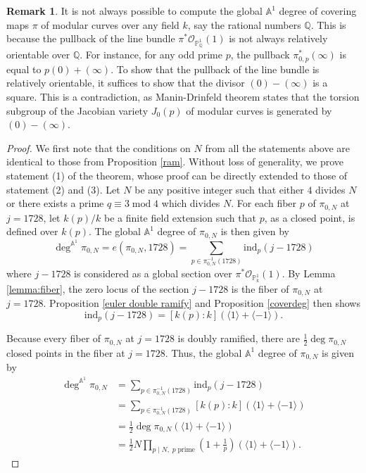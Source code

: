 \documentclass[12pt, reqno]{amsart}
\theoremstyle{definition}
\newtheorem{remark}[theorem]{Remark}
\newcommand{\A}{\mathbb{A}} %
\newcommand{\Proj}{\mathbb{P}} %
\newcommand{\Q}{\mathbb{Q}}
\newcommand{\Adeg}{\deg^{\mathbb{A}^1}} %
\newcommand{\Oh}{\mathscr{O}} %
\newcommand{\ind}{\mathrm{ind}} %
\begin{document}
\begin{remark}
It is not always possible to compute the global $\A^1$ degree of covering maps $\pi$ of modular curves over any field $k$, say the rational numbers $\Q$. This is because the pullback of the line bundle $\pi^* \Oh_{\Proj^1_\mathbb{Q}}(1)$ is not always relatively orientable over $\Q$. For instance, for any odd prime $p$, the pullback $\pi_{0,p}^*(\infty)$ is equal to $p (0) + (\infty)$. To show that the pullback of the line bundle is relatively orientable, it suffices to show that the divisor $(0) - (\infty)$ is a square. This is a contradiction, as Manin-Drinfeld theorem states that the torsion subgroup of the Jacobian variety $J_0(p)$ of modular curves is generated by $(0) - (\infty)$. 
\end{remark}

\begin{proof}
We first note that the conditions on $N$ from all the statements above are identical to those from Proposition \ref{ram}. Without loss of generality, we prove statement (1) of the theorem, whose proof can be directly extended to those of statement (2) and (3). 
Let $N$ be any positive integer such that either $4$ divides $N$ or there exists a prime $q \equiv 3 \; \text{mod} \; 4$ which divides $N$. For each fiber $p$ of $\pi_{0,N}$ at $j = 1728$, let $k(p) / k$ be a finite field extension such that $p$, as a closed point, is defined over $k(p)$. The global $\A^1$ degree of $\pi_{0,N}$ is then given by
\begin{equation*}
    \Adeg \pi_{0,N} = e(\pi_{0,N}, 1728) = \sum_{p \in \pi_{0,N}^{-1}(1728)} \ind_p (j-1728)
\end{equation*}
where $j - 1728$ is considered as a global section over $\pi^* \Oh_{\Proj^1_k}(1)$. By Lemma \ref{lemma:fiber}, the zero locus of the section $j - 1728$ is the fiber of $\pi_{0,N}$ at $j = 1728$. Proposition \ref{euler double ramify} and Proposition \ref{coverdeg} then shows
\begin{equation*}
    \ind_p (j - 1728) = [k(p):k] (\langle 1 \rangle + \langle -1 \rangle).
\end{equation*}

Because every fiber of $\pi_{0,N}$ at $j=1728$ is doubly ramified, there are $\frac{1}{2} \deg \pi_{0,N}$ closed points in the fiber at $j = 1728$. Thus, the global $\A^1$ degree of $\pi_{0,N}$ is given by
\begin{align*}
    \Adeg \pi_{0,N} &= \sum_{p \in \pi_{0,N}^{-1}(1728)} \ind_p (j - 1728) \\
    &= \sum_{p \in \pi_{0,N}^{-1}(1728)} [k(p):k] \left( \langle 1 \rangle + \langle -1 \rangle \right) \\
    &= \frac{1}{2} \deg \pi_{0,N} \left( \langle 1 \rangle + \langle -1 \rangle \right) \\
    &= \frac{1}{2} N \prod_{p \mid N, \; p \; \text{prime}} \left( 1 + \frac{1}{p} \right) \left( \langle 1 \rangle + \langle -1 \rangle \right).
\end{align*}
\end{proof}
\end{document}

